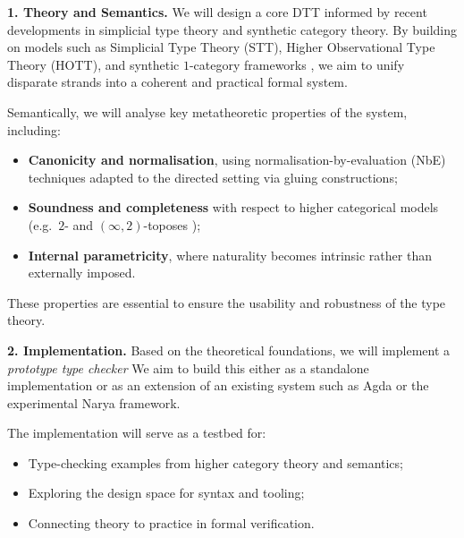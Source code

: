 \documentclass[a4paper,11pt]{article}
\renewcommand{\paragraph}[1]{\textbf{#1.}}
\begin{document}
\paragraph{1. Theory and Semantics}
We will design a core DTT informed by recent developments in
simplicial type theory and synthetic category theory.
By building on models such as Simplicial Type Theory (STT), Higher Observational Type Theory (HOTT), and synthetic $1$-category frameworks \cite{riehlshulman2017, licata2016, north_2019, altenkirch_neumann_2024}, we aim to unify disparate strands into a coherent and practical formal system.

Semantically, we will analyse key metatheoretic properties of the system, including:
\begin{itemize}
  \item \textbf{Canonicity and normalisation}, using normalisation-by-evaluation (NbE) techniques adapted to the directed setting via gluing constructions;
  \item \textbf{Soundness and completeness} with respect to higher
    categorical models
    (e.g.\ $2$- and $(\infty,2)$-toposes \cite{street2topos,abellan-martini});
  \item \textbf{Internal parametricity}, where naturality becomes intrinsic rather than externally imposed.
\end{itemize}
These properties are essential to ensure the usability and robustness of the type theory.

\paragraph{2. Implementation}
Based on the theoretical foundations, we will implement a
\emph{prototype type checker}
We aim to build this either as a standalone implementation or as an
extension of an existing system such as \textsf{Agda} or the
experimental \textsf{Narya} \cite{Shulman2025Narya} framework.

The implementation will serve as a testbed for:
\begin{itemize}
  \item Type-checking examples from higher category theory and semantics;
  \item Exploring the design space for syntax and tooling;
  \item Connecting theory to practice in formal verification.
\end{itemize}
\end{document}
